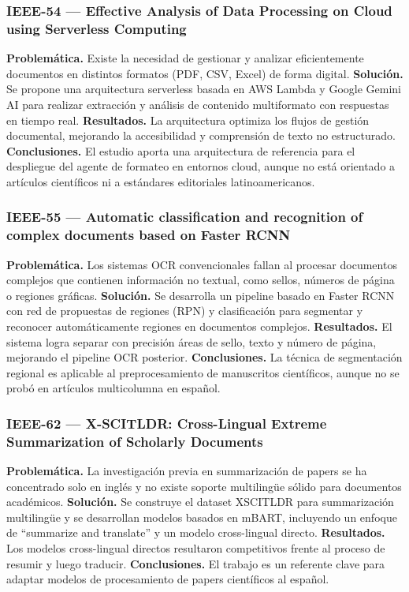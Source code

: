 \subsubsection*{IEEE-54 --- Effective Analysis of Data Processing on Cloud using Serverless Computing \cite{ref14}}

\textbf{Problemática.} Existe la necesidad de gestionar y analizar eficientemente documentos en distintos formatos (PDF, CSV, Excel) de forma digital. \textbf{Solución.} Se propone una arquitectura serverless basada en AWS Lambda y Google Gemini AI para realizar extracción y análisis de contenido multiformato con respuestas en tiempo real. \textbf{Resultados.} La arquitectura optimiza los flujos de gestión documental, mejorando la accesibilidad y comprensión de texto no estructurado. \textbf{Conclusiones.} El estudio aporta una arquitectura de referencia para el despliegue del agente de formateo en entornos cloud, aunque no está orientado a artículos científicos ni a estándares editoriales latinoamericanos.

\subsubsection*{IEEE-55 --- Automatic classification and recognition of complex documents based on Faster RCNN \cite{ref15}}

\textbf{Problemática.} Los sistemas OCR convencionales fallan al procesar documentos complejos que contienen información no textual, como sellos, números de página o regiones gráficas. \textbf{Solución.} Se desarrolla un pipeline basado en Faster RCNN con red de propuestas de regiones (RPN) y clasificación para segmentar y reconocer automáticamente regiones en documentos complejos. \textbf{Resultados.} El sistema logra separar con precisión áreas de sello, texto y número de página, mejorando el pipeline OCR posterior. \textbf{Conclusiones.} La técnica de segmentación regional es aplicable al preprocesamiento de manuscritos científicos, aunque no se probó en artículos multicolumna en español.

\subsubsection*{IEEE-62 --- X-SCITLDR: Cross-Lingual Extreme Summarization of Scholarly Documents \cite{ref16}}

\textbf{Problemática.} La investigación previa en summarización de papers se ha concentrado solo en inglés y no existe soporte multilingüe sólido para documentos académicos. \textbf{Solución.} Se construye el dataset XSCITLDR para summarización multilingüe y se desarrollan modelos basados en mBART, incluyendo un enfoque de ``summarize and translate'' y un modelo cross-lingual directo. \textbf{Resultados.} Los modelos cross-lingual directos resultaron competitivos frente al proceso de resumir y luego traducir. \textbf{Conclusiones.} El trabajo es un referente clave para adaptar modelos de procesamiento de papers científicos al español.

